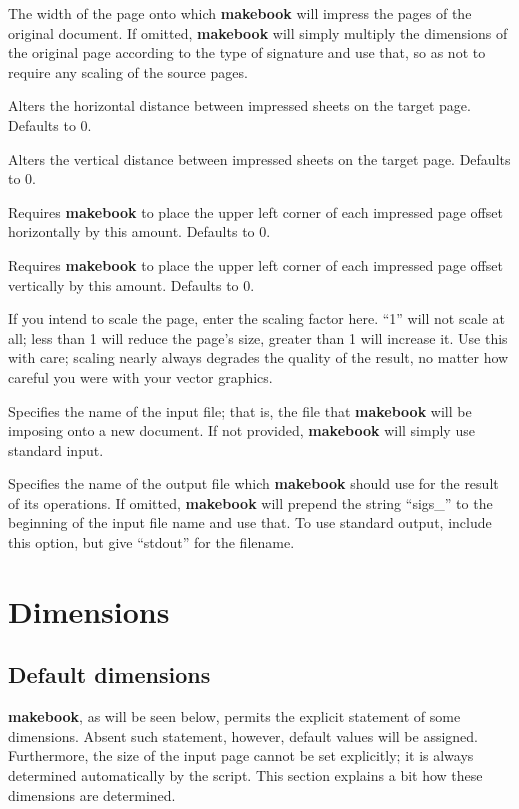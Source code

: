 \documentclass[12pt,twoside,final]{extarticle}
\begin{document}
\begin{description}[noitemsep]
\item[-w width of target page]The width of the page onto which \textbf{makebook} will impress the pages of the original document. If omitted, \textbf{makebook} will simply multiply the dimensions of the original page according to the type of signature and use that, so as not to require any scaling of the source pages.
\item[-d horiz. delta]Alters the horizontal distance between impressed sheets on the target page. Defaults to 0.
\item[-D vert. delta]Alters the vertical distance between impressed sheets on the target page. Defaults to 0.
\item[-m horiz. offset]Requires \textbf{makebook} to place the upper left corner of each impressed page offset horizontally by this amount. Defaults to 0.
\item[-M vert. offset]Requires \textbf{makebook} to place the upper left corner of each impressed page offset vertically by this amount. Defaults to 0.
\item[-s scale]If you intend to scale the page, enter the scaling factor here. ``1'' will not scale at all; less than 1 will reduce the page's size, greater than 1 will increase it. Use this with care; scaling nearly always degrades the quality of the result, no matter how careful you were with your vector graphics.
\item[-i input file]Specifies the name of the input file; that is, the file that \textbf{makebook} will be imposing onto a new document. If not provided, \textbf{makebook} will simply use standard input.
\item[-o output file]Specifies the name of the output file which \textbf{makebook} should use for the result of its operations. If omitted, \textbf{makebook} will prepend the string ``sigs\_'' to the beginning of the input file name and use that. To use standard output, include this option, but give ``stdout'' for the filename.
\end{description}
\section{Dimensions}
\subsection{Default dimensions}
\textbf{makebook}, as will be seen below, permits the explicit statement of some dimensions. Absent such statement, however, default values will be assigned.  Furthermore, the size of the input page cannot be set explicitly; it is always determined automatically by the script. This section explains a bit how these dimensions are determined.
\end{document}
